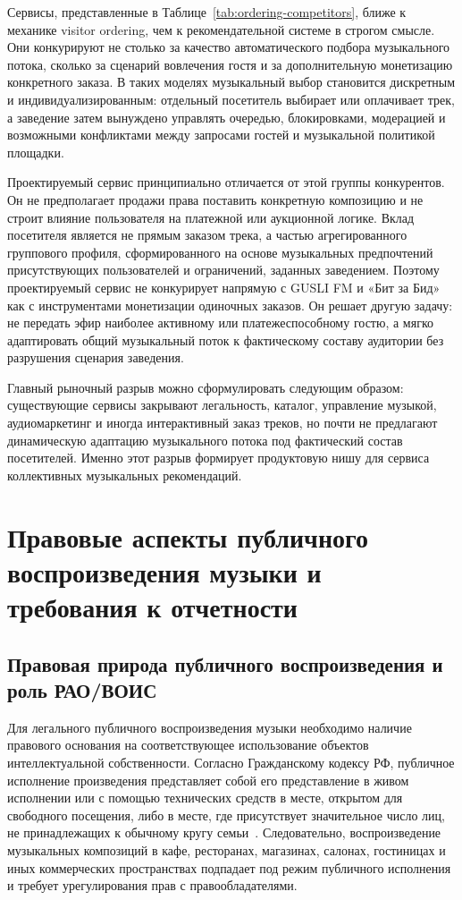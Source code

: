 Сервисы, представленные в Таблице~\ref{tab:ordering-competitors}, ближе к механике visitor ordering, чем к рекомендательной системе в строгом смысле. Они конкурируют не столько за качество автоматического подбора музыкального потока, сколько за сценарий вовлечения гостя и за дополнительную монетизацию конкретного заказа. В таких моделях музыкальный выбор становится дискретным и индивидуализированным: отдельный посетитель выбирает или оплачивает трек, а заведение затем вынуждено управлять очередью, блокировками, модерацией и возможными конфликтами между запросами гостей и музыкальной политикой площадки.

Проектируемый сервис принципиально отличается от этой группы конкурентов. Он не предполагает продажи права поставить конкретную композицию и не строит влияние пользователя на платежной или аукционной логике. Вклад посетителя является не прямым заказом трека, а частью агрегированного группового профиля, сформированного на основе музыкальных предпочтений присутствующих пользователей и ограничений, заданных заведением. Поэтому проектируемый сервис не конкурирует напрямую с GUSLI FM и «Бит за Бид» как с инструментами монетизации одиночных заказов. Он решает другую задачу: не передать эфир наиболее активному или платежеспособному гостю, а мягко адаптировать общий музыкальный поток к фактическому составу аудитории без разрушения сценария заведения.

Главный рыночный разрыв можно сформулировать следующим образом: существующие сервисы закрывают легальность, каталог, управление музыкой, аудиомаркетинг и иногда интерактивный заказ треков, но почти не предлагают динамическую адаптацию музыкального потока под фактический состав посетителей. Именно этот разрыв формирует продуктовую нишу для сервиса коллективных музыкальных рекомендаций.

\section{Правовые аспекты публичного воспроизведения музыки и требования к отчетности}
\label{sec:market:legal}

\subsection{Правовая природа публичного воспроизведения и роль РАО/ВОИС}

Для легального публичного воспроизведения музыки необходимо наличие правового основания на соответствующее использование объектов интеллектуальной собственности. Согласно Гражданскому кодексу РФ, публичное исполнение произведения представляет собой его представление в живом исполнении или с помощью технических средств в месте, открытом для свободного посещения, либо в месте, где присутствует значительное число лиц, не принадлежащих к обычному кругу семьи~\cite{gk_rf_1270}. Следовательно, воспроизведение музыкальных композиций в кафе, ресторанах, магазинах, салонах, гостиницах и иных коммерческих пространствах подпадает под режим публичного исполнения и требует урегулирования прав с правообладателями.

